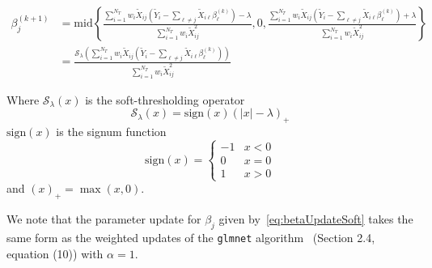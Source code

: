\documentclass[12pt,letter]{article}\usepackage[]{graphicx}\usepackage[]{color}
\newcommand{\tm}[1]{\textrm{{#1}}}
\newcommand{\Xtilde}{\widetilde{X}}
\newcommand{\Ytilde}{\widetilde{Y}}
\begin{document}
\begin{align}
	\beta_j^{(k+1)} & = \tm{mid}\left\lbrace \frac{  \sum_{i=1}^{N_T} w_i \Xtilde_{ij}\left(  \Ytilde_i - \sum_{\ell \neq j}\Xtilde_{i\ell} \beta_\ell^{(k)} \right) - \lambda}{\sum_{i=1}^{N_T} w_i \Xtilde_{ij}^2}, 0,\frac{  \sum_{i=1}^{N_T} w_i \Xtilde_{ij}\left(  \Ytilde_i - \sum_{\ell \neq j}\Xtilde_{i\ell} \beta_\ell^{(k)} \right) + \lambda}{\sum_{i=1}^{N_T} w_i \Xtilde_{ij}^2} \right\rbrace \nonumber \\
	& = \frac{\mathcal{S}_{\lambda}\left( \sum_{i=1}^{N_T} w_i \Xtilde_{ij}\left(  \Ytilde_i - \sum_{\ell \neq j}\Xtilde_{i\ell} \beta_\ell^{(k)} \right)\right) }{\sum_{i=1}^{N_T} w_i \Xtilde_{ij}^2} \label{eq:betaUpdateSoft}
\end{align}

Where $\mathcal{S}_{\lambda}(x)$ is the soft-thresholding operator
\begin{equation*}
	\mathcal{S}_{\lambda}(x) = \tm{sign}(x)(|x| - \lambda)_+
\end{equation*}
$\textrm{sign}(x)$ is the signum function
\begin{equation*}
	\textrm{sign}(x) = \begin{cases}
		-1 & x<0\\
		0 & x= 0\\
		1 & x>0
	\end{cases}
\end{equation*}
and $(x)_+ = \max(x, 0)$.

We note that the parameter update for $\beta_j$ given by~\eqref{eq:betaUpdateSoft} takes the same form as the weighted updates of the \texttt{glmnet} algorithm~\citep{friedman2010regularization} (Section 2.4, equation (10)) with $\alpha=1$.
\end{document}
